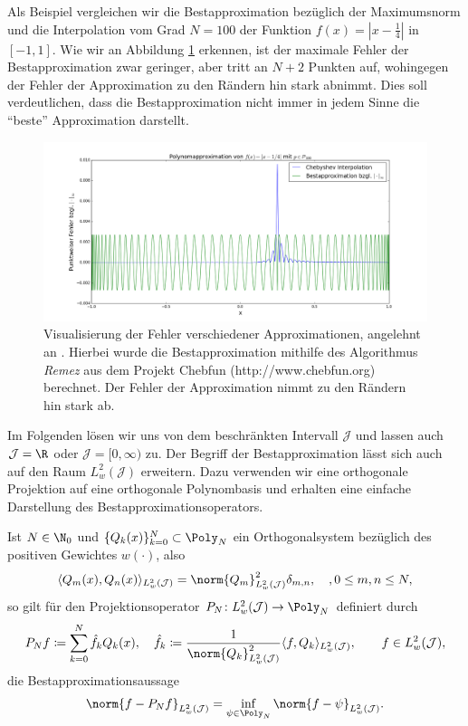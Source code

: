 \begin{mathbsp}
Als Beispiel vergleichen wir die Bestapproximation bezüglich der Maximumsnorm und die \chebyspace Interpolation vom Grad $N=100$ der Funktion $f(x)=|x-\frac{1}{4}|$ in $[-1,1]$. Wie wir an Abbildung \ref{polyapproxcomp} erkennen, ist der maximale Fehler der Bestapproximation zwar geringer, aber tritt an $N+2$ Punkten auf, wohingegen der Fehler der \chebyspace Approximation zu den Rändern hin stark abnimmt. Dies soll verdeutlichen, dass die Bestapproximation nicht immer in jedem Sinne die "`beste"' Approximation darstellt.
\begin{figure}[ht]
 \center
 \includegraphics[width=\linewidth]{Figures/polynomial_approx_comparison.png}
 \caption{Visualisierung der Fehler verschiedener Approximationen, angelehnt an \autocite{Trefethen}. Hierbei wurde die Bestapproximation mithilfe des Algorithmus \emph{Remez} aus dem Projekt Chebfun (http://www.chebfun.org) berechnet. Der Fehler der \chebyspace Approximation nimmt zu den Rändern hin stark ab.}
 \label{polyapproxcomp}
\end{figure}
\end{mathbsp}
Im Folgenden lösen wir uns von dem beschränkten Intervall $\mathcal{J}$ und lassen auch $\mathcal{J}=\R$ oder $\mathcal{J}=[0,\infty)$ zu. Der Begriff der Bestapproximation lässt sich auch auf den Raum $L_w^2(\mathcal{J})$ erweitern. Dazu verwenden wir eine orthogonale Projektion auf eine orthogonale Polynombasis und erhalten eine einfache Darstellung des Bestapproximationsoperators.
\begin{maththeorem}
Ist $N\in\N_0$ und $\lbrace Q_k(x)\rbrace_{k=0}^N\subset \Poly_N$ ein Orthogonalsystem bezüglich des positiven Gewichtes $w(\cdot)$, also 
\[\langle Q_m(x),Q_n(x)\rangle_{L_w^2(\mathcal{J})}=\norm{Q_m}^2_{L_w^2(\mathcal{J})}\delta_{m,n},\quad, 0\le m,n\le N,\]
so gilt für den Projektionsoperator $P_N\colon L_w^2(\mathcal{J})\to \Poly_N$ definiert durch 
\[P_Nf\coloneqq \sum_{k=0}^N\hat{f}_kQ_k(x),\quad \hat{f}_k\coloneqq \frac{1}{\norm{Q_k}_{L_w^2(\mathcal{J})}^2}\langle f,Q_k\rangle_{L_w^2(\mathcal{J})},\qquad f\in L^2_w(\mathcal{J}),\]
die Bestapproximationsaussage
\[\norm{f-P_Nf}_{L_w^2(\mathcal{J})}=\inf\limits_{\psi\in\Poly_N}\norm{f-\psi}_{L_w^2(\mathcal{J})}.\]
\end{maththeorem}
